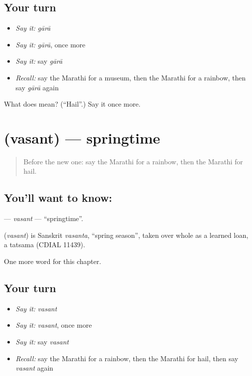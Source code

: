 \subsection*{Your turn}
\begin{itemize}
\raggedright
  \item \emph{Say it:} \emph{gārā}
  \item \emph{Say it:} \emph{gārā}, once more
  \item \emph{Say it:} say \emph{gārā}
  \item \emph{Recall:} say the Marathi for a museum, then the Marathi for a rainbow, then say \emph{gārā} again
\end{itemize}

\begin{tcolorbox}[breakable,colback=teal!4,colframe=teal!35!black,title={Before you move on}]
What does  mean? (\textquotedblleft{}Hail\textquotedblright{}.) Say it once more.
\end{tcolorbox}
\section[\texorpdfstring{\mr{वसंत} (vasant)}{वसंत (vasant)}]{ (vasant) — springtime}

\label{lesson:MR-C246-vasant}



\begin{quote}
Before the new one: say the Marathi for a rainbow, then the Marathi for hail.
\end{quote}

\subsection*{You'll want to know: }
\textbf{} — \emph{vasant} — \textquotedblleft{}springtime\textquotedblright{}.

\begin{cousinweb}
\textbf{} (\emph{vasant}) is Sanskrit \emph{vasanta}, \textquotedblleft{}spring season\textquotedblright{}, taken over whole as a learned loan, a tatsama (CDIAL 11439).
\end{cousinweb}

\begin{grammarlens}[title={What you've built}]
One more word for this chapter.
\end{grammarlens}

\subsection*{Your turn}
\begin{itemize}
\raggedright
  \item \emph{Say it:} \emph{vasant}
  \item \emph{Say it:} \emph{vasant}, once more
  \item \emph{Say it:} say \emph{vasant}
  \item \emph{Recall:} say the Marathi for a rainbow, then the Marathi for hail, then say \emph{vasant} again
\end{itemize}

